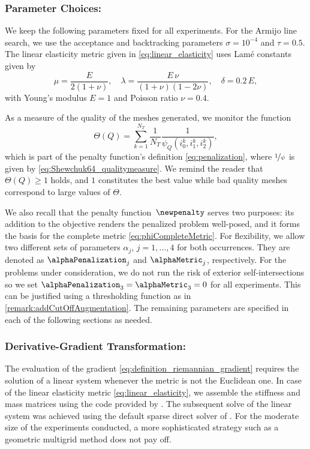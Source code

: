 \subsubsection*{Parameter Choices:}
We keep the following parameters fixed for all experiments.
For the Armijo line search, we use the acceptance and backtracking parameters $\sigma = 10^{-4}$ and $\tau = 0.5$.
The linear elasticity metric given in \eqref{eq:linear_elasticity} uses Lamé constants given by
\begin{equation}
	\label{eq:Lame_parameters}
	\mu = \frac{E}{2(1+\nu)}
	,
	\quad
	\lambda = \frac{E \, \nu}{(1+\nu)(1-2\nu)}
	,
	\quad
	\delta = 0.2 \, E
	,
\end{equation}
with Young's modulus $E = 1$ and Poisson ratio $\nu = 0.4$.

As a measure of the quality of the meshes generated, we monitor the function
\begin{equation}
	\label{eq:quality_measure}
	\Theta(Q)
	=
	\sum_{k=1}^{N_T} \frac{1}{N_T} \frac{1}{\psi_Q(i_0^k,i_1^k,i_2^k)}
	,
\end{equation}
which is part of the penalty function's definition \eqref{eq:penalization}, where $\nicefrac{1}{\psi}$ is given by \eqref{eq:Shewchuk64_qualitymeasure}.
We remind the reader that $\Theta(Q) \ge 1$ holds, and $1$ constitutes the best value while bad quality meshes correspond to large values of $\Theta$.


We also recall that the penalty function~$\newpenalty$ serves two purposes: its addition to the objective renders the penalized problem well-posed, and it forms the basis for the complete metric \eqref{eq:phiCompleteMetric}.
For flexibility, we allow two different sets of parameters $\alpha_j$, $j = 1, \ldots, 4$ for both occurrences.
They are denoted as $\alphaPenalization_j$ and $\alphaMetric_j$, respectively.
For the problems under consideration, we do not run the risk of exterior self-intersections so we set $\alphaPenalization_3 = \alphaMetric_3 = 0$ for all experiments.
This can be justified using a thresholding function as in \cref{remark:addCutOffAugmentation}.
The remaining parameters are specified in each of the following sections as needed.


\subsubsection*{Derivative-Gradient Transformation:}
The evaluation of the gradient \eqref{eq:definition_riemannian_gradient} requires the solution of a linear system whenever the metric is not the Euclidean one.
In case of the linear elasticity metric \eqref{eq:linear_elasticity}, we assemble the stiffness and mass matrices using the code provided by \cite{Koko:2016:1,Koko:2016:2}.
The subsequent solve of the linear system was achieved using the default sparse direct solver of \matlab.
For the moderate size of the experiments conducted, a more sophisticated strategy such as a geometric multigrid method does not pay off.


